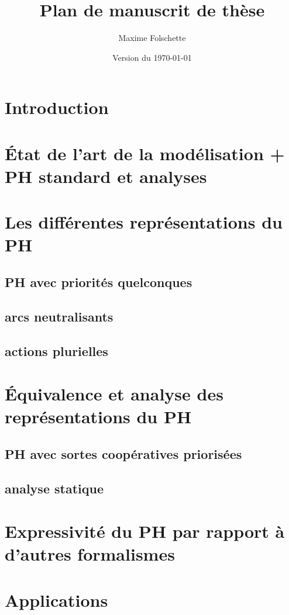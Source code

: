 \documentclass[a4paper]{report}
\author{Maxime Folschette}
\title{Plan de manuscrit de thèse}
\date{Version du \today}
\begin{document}
\setcounter{tocdepth}{3}
\tableofcontents



\chapter{Introduction}

\chapter{État de l'art de la modélisation + PH standard et analyses}

\chapter{Les différentes représentations du PH}
  \section{PH avec priorités quelconques}
  \section{arcs neutralisants}
  \section{actions plurielles}

\chapter{Équivalence et analyse des représentations du PH}
  \section{PH avec sortes coopératives priorisées}
  \section{analyse statique}

\chapter{Expressivité du PH par rapport à d'autres formalismes}

\chapter{Applications}
\end{document}
